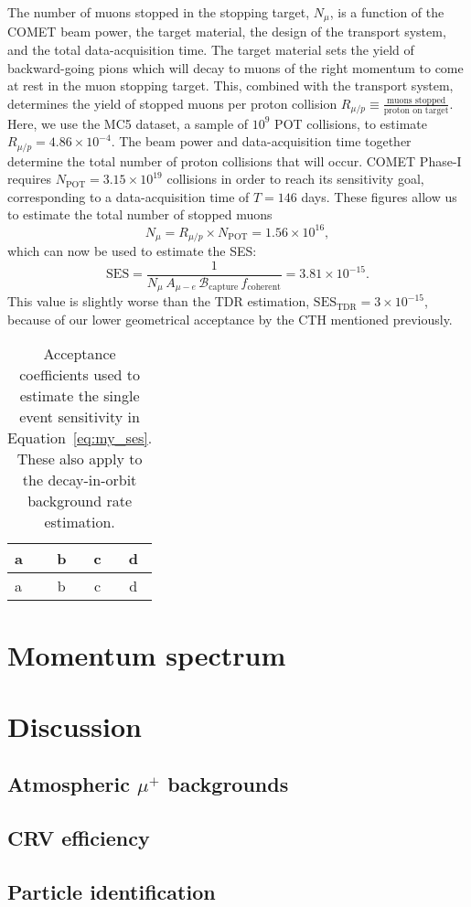 The number of muons stopped in the stopping target, $N_\mu$, is a function of
the COMET beam power, the target material, the design of the
transport system, and the total data-acquisition time. 
The target material sets the yield of
backward-going pions which will decay to muons of the right momentum to come at
rest in the muon stopping target. This, combined with the transport system,
determines the yield of stopped muons per proton collision $R_{\mu/p} \equiv
\frac{\text{muons stopped}}{\text{proton on target}}$. Here, we use the
MC5 dataset, a sample of $10^9$ POT collisions, to estimate $R_{\mu/p}=4.86
\times 10^{-4}$.
The beam power and data-acquisition time together determine the total number of proton
collisions that will occur. COMET Phase-I requires $N_\mathrm{POT} = 3.15 \times
10^{19}$ collisions in order to reach its sensitivity goal, corresponding to a
data-acquisition time of $T=146$ days.
These figures allow us to estimate the total number of stopped muons
$$N_\mu = R_{\mu/p} \times N_\mathrm{POT} = 1.56\times 10^{16},$$
which can now be used to estimate the SES:
\begin{equation}\label{eq:my_ses}
\mathrm{SES}
=\frac{1}{N_\mu\,A_{\mu-e}\,\mathcal{B}_\mathrm{capture}\,f_\mathrm{coherent}}
= 3.81\times10^{-15}.
\end{equation}
This value is slightly worse than the TDR estimation,
$\mathrm{SES}_\mathrm{TDR}=3\times 10^{-15}$, because of our lower geometrical
acceptance by the CTH mentioned previously.

\begin{table}
    \centering\begin{tabular}{l|ccc}
        \toprule
        a&b&c&d\\\midrule
        a&b&c&d\\
        \bottomrule
    \end{tabular}
    \caption{ Acceptance coefficients used to estimate the single event
    sensitivity in Equation~\ref{eq:my_ses}. These also apply to the
    decay-in-orbit background rate estimation. }
    \label{tab:ses_efficiency_factors}
\end{table}


\section{Momentum spectrum}

\section{Discussion}

\subsection{Atmospheric $\mu^+$ backgrounds}

\subsection{CRV efficiency}

\subsection{Particle identification}
